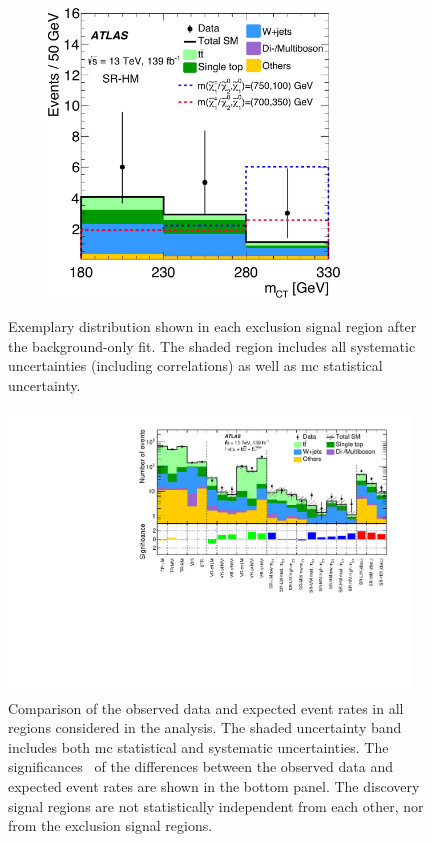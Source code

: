 \begin{figure}
\begin{subfigure}[b]{0.5\linewidth}
		\centering\includegraphics[width=0.85\textwidth]{OneLepton_Wh_SRHMEM_mct2_yellow}
	\end{subfigure}\hfill

	\caption{Exemplary distribution shown in each exclusion signal region after the background-only fit. The shaded region includes all systematic uncertainties (including correlations) as well as \gls{mc} statistical uncertainty.}
	\label{fig:SR_distributions_postfit}
\end{figure}


 \begin{figure}
	\centering\includegraphics[width=0.95\textwidth]{histpull_CRVRSR}
	\caption{Comparison of the observed data and expected event rates in all regions considered in the analysis. The shaded uncertainty band includes both \gls{mc} statistical and systematic uncertainties. The significances~\cite{Cousins:2007bmb} of the differences between the observed data and expected event rates are shown in the bottom panel. The discovery signal regions are not statistically independent from each other, nor from the exclusion signal regions.}
	\label{fig:result_histpull}
\end{figure}


